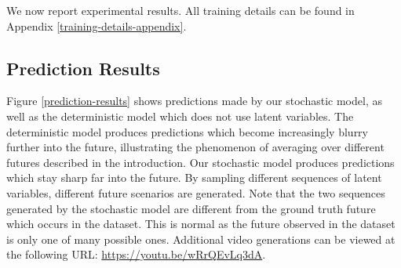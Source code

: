 \documentclass{article} %
\begin{document}
We now report experimental results. All training details can be found in Appendix \ref{training-details-appendix}.


    \subsection{Prediction Results}


    Figure \ref{prediction-results} shows predictions made by our stochastic model, as well as the deterministic model which does not use latent variables.
    The deterministic model produces predictions which become increasingly blurry further into the future, illustrating the phenomenon of averaging over different futures described in the introduction. Our stochastic model produces predictions which stay sharp far into the future.
    By sampling different sequences of latent variables, different future scenarios are generated.
    Note that the two sequences generated by the stochastic model are different from the ground truth future which occurs in the dataset.
    This is normal as the future observed in the dataset is only one of many possible ones.
    Additional video generations can be viewed at the following URL: \url{https://youtu.be/wRrQEvLq3dA}.
\end{document}
